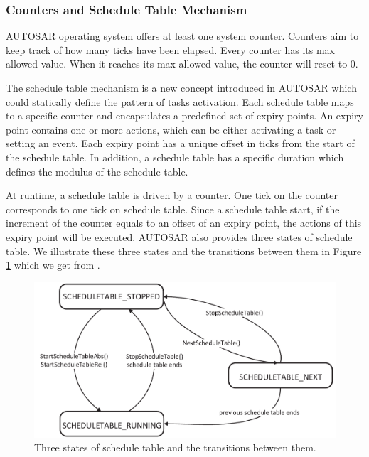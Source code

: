 \documentclass[10pt,conference]{IEEEtran}
\begin{document}
\subsubsection{Counters and Schedule Table Mechanism}

AUTOSAR operating system offers at least one system counter. Counters aim to keep track of how many ticks have been elapsed. Every counter has its max allowed value. When it reaches its max allowed value, the counter will reset to 0.

The schedule table mechanism is a new concept introduced in AUTOSAR which could statically define the pattern of tasks activation. Each schedule table maps to a specific counter and encapsulates a predefined set of expiry points. An expiry point contains one or more actions, which can be either activating a task or setting an event. Each expiry point has a unique offset in ticks from the start of the schedule table. In addition, a schedule table has a specific duration which defines the modulus of the schedule table.

At runtime, a schedule table is driven by a counter. One tick on the counter corresponds to one tick on schedule table. Since a schedule table start, if the increment of the counter equals to an offset of an expiry point, the actions of this expiry point will be executed. AUTOSAR also provides three states of schedule table. We illustrate these three states and the transitions between them in Figure \ref{figure_state_st} which we get from \cite{autosar}.

\begin{figure}[t]
\centering
\includegraphics[scale=.39]{graphics/Figure_state_st-eps-converted-to.pdf}
\caption{Three states of schedule table and the transitions between them.}
\label{figure_state_st}
\end{figure}
\end{document}
